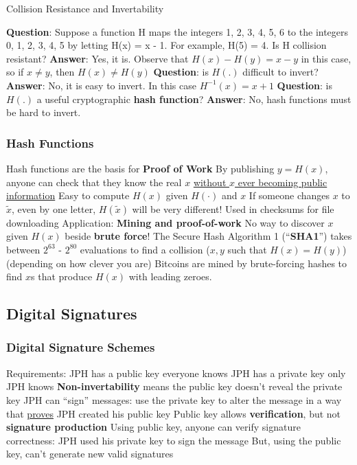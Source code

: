 \documentclass[aspectratio=169]{beamer}
\begin{document}
\begin{frame}{Collision Resistance and Invertability}

\textbf{Question}: Suppose a function H maps the integers {1, 2, 3, 4, 5, 6} to the integers {0, 1, 2, 3, 4, 5} by letting H(x) = x - 1. For example, H(5) = 4. Is H collision resistant? \pause 
\vfill 
\textbf{Answer}: Yes, it is. Observe that $H(x) - H(y) = x - y$ in this case, so if $x \ne y$, then $H(x) \ne H(y)$ \pause 
\vfill 
\textbf{Question}: is $H(.)$ difficult to invert? \pause 
\vfill 
\textbf{Answer}: No, it is easy to invert. In this case $H^{-1}(x) = x + 1$ \pause \vfill 
\textbf{Question}: is $H(.)$ a useful cryptographic \textbf{hash function}? \pause 
\vfill 
\textbf{Answer}: No, hash functions must be hard to invert. 
    
\end{frame}


\begin{frame}
\frametitle{Hash Functions}

Hash functions are the basis for \textbf{Proof of Work}
\bi
\m By publishing $y=H(x)$, anyone can check that they know the real $x$ \ul{without $x$ ever becoming public information} \pause 
\bi
\m Easy to compute $H(x)$ given $H(\cdot)$ and $x$ \pause 
\m If someone changes $x$ to $\tilde{x}$, even by one letter, $H(\tilde{x})$ will be very different!
\m Used in checksums for file downloading \pause 
\ei
\m Application: \textbf{Mining and proof-of-work}
\bi 
\m No way to discover $x$ given $H(x)$ beside \textbf{brute force}! \pause 
\m The Secure Hash Algorithm 1 (``\textbf{SHA1}'') takes between $2^{63}$ - $2^{80}$ evaluations to find a collision ($x,y$ such that $H(x)=H(y)$) (depending on how clever you are) \pause 
\m Bitcoins are mined by brute-forcing hashes to find $x$s that produce $H(x)$ with leading zeroes. 
\ei 
\ei

\end{frame}

\subsection{Digital Signatures}

\begin{frame}
\frametitle{Digital Signature Schemes}

Requirements:
\bi
\m JPH has a public key everyone knows
\m JPH has a private key only JPH knows
\bi 
\m \textbf{Non-invertability} means the public key doesn't reveal the private key \pause 
\ei 
\m JPH can ``sign'' messages: use the private key to alter the message in a way that \ul{proves} JPH created his public key 
\m Public key allows \textbf{verification}, but not \textbf{signature production} \pause 
\bi
\m Using public key, anyone can verify signature correctness: JPH used his private key to sign the message \pause 
\m But, using the public key, can't generate new valid signatures
\ei
\ei

\end{frame}
\end{document}
